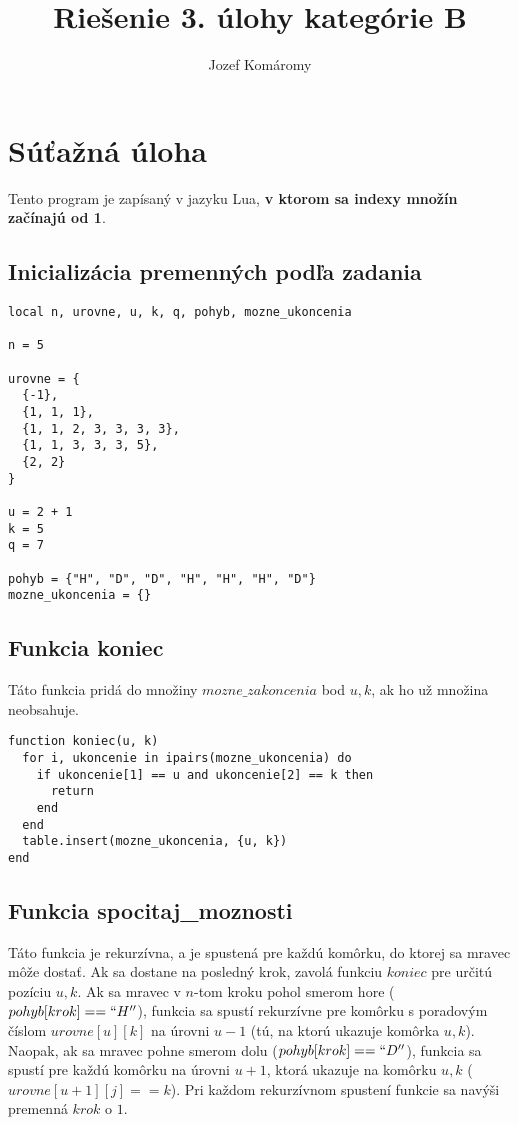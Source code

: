 \documentclass{article}
\begin{document}
\title{Riešenie 3. úlohy kategórie B}
\author{Jozef Komáromy}

\maketitle


\section{Súťažná úloha}

Tento program je zapísaný v jazyku Lua, \textbf{v ktorom sa indexy množín začínajú od 1}.


\subsection{Inicializácia premenných podľa zadania}

\begin{lstlisting}
local n, urovne, u, k, q, pohyb, mozne_ukoncenia

n = 5

urovne = {
  {-1},
  {1, 1, 1},
  {1, 1, 2, 3, 3, 3, 3},
  {1, 1, 3, 3, 3, 5},
  {2, 2}
}

u = 2 + 1
k = 5
q = 7

pohyb = {"H", "D", "D", "H", "H", "H", "D"}
mozne_ukoncenia = {}
\end{lstlisting}

\subsection{Funkcia koniec}


Táto funkcia pridá do množiny \(mozne\_zakoncenia\) bod \({u, k}\), ak ho už množina neobsahuje.


\begin{lstlisting}
function koniec(u, k)
  for i, ukoncenie in ipairs(mozne_ukoncenia) do
    if ukoncenie[1] == u and ukoncenie[2] == k then
      return
    end
  end
  table.insert(mozne_ukoncenia, {u, k})
end
\end{lstlisting}

\subsection{Funkcia spocitaj\_moznosti}

Táto funkcia je rekurzívna, a je spustená pre každú komôrku, do ktorej sa mravec môže dostať. Ak sa dostane na posledný krok, zavolá funkciu \(koniec\) pre určitú pozíciu \(u, k\).
Ak sa mravec v \(n\)-tom kroku pohol smerom hore (\(pohyb[krok] == ``H''\)), funkcia sa spustí rekurzívne pre komôrku s poradovým číslom \(urovne[u][k]\) na úrovni \(u - 1\) (tú, na ktorú ukazuje komôrka \(u, k\)).
Naopak, ak sa mravec pohne smerom dolu (\(pohyb[krok] == ``D''\)), funkcia sa spustí pre každú komôrku na úrovni \(u + 1\), ktorá ukazuje na komôrku \(u, k\) (\(urovne[u+1][j] == k\)).
Pri každom rekurzívnom spustení funkcie sa navýši premenná \(krok\) o \(1\).
\end{document}
